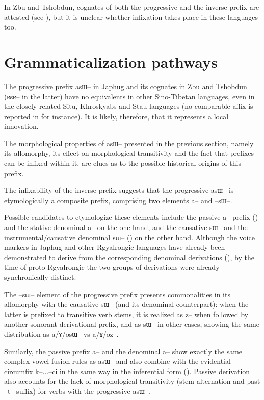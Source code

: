 \documentclass[oldfontcommands,oneside,a4paper,11pt]{article}
\newcommand{\ipa}[1]{{\phon \mbox{#1}}} %
\begin{document}
In Zbu and Tshobdun, cognates of both the progressive and the inverse prefix are attested (see \citealt{jackson02rentongdengdi, gongxun14agreement, gongx18zbu}), but it is unclear whether infixation takes place in these languages too.
 

\section{Grammaticalization pathways}
The progressive prefix \ipa{asɯ--} in Japhug and its cognates in Zbu and Tshobdun (\ipa{ɐsɐ--} in the latter) have no equivalents in other Sino-Tibetan languages, even in the closely related Situ, Khroskyabs and Stau languages (no comparable affix is reported in \citealt{linxr93jiarong, prins16kyomkyo, huangbf07lavrung, lai17khroskyabs, zhang16bragdbar} for instance). It is likely, therefore, that it represents a local innovation.

The morphological properties of \ipa{asɯ--} presented in the previous section, namely its allomorphy, its effect on morphological transitivity and the fact that prefixes can be infixed within it, are clues as to the possible historical origins of this prefix.

The infixability of the inverse prefix suggests that the progressive \ipa{asɯ--} is etymologically a composite prefix, comprising two elements \ipa{a--} and \ipa{--sɯ--}. 

Possible candidates to etymologize these elements include the  passive \ipa{a--} prefix (\citealt{jacques07passif}) and the stative denominal \ipa{a--} on the one hand, and the causative \ipa{sɯ--} and the instrumental/causative denominal \ipa{sɯ--} (\citealt{jacques15causative}) on the other hand. Although the voice markers in Japhug and other Rgyalrongic languages have already been demonstrated to derive from the corresponding denominal derivations (\citealt{jacques14antipassive, jacques15causative, lai16caus}), by the time of proto-Rgyalrongic the two groups of derivations were already synchronically distinct.

The \ipa{--sɯ--} element of the progressive prefix presents commonalities in its allomorphy with the causative \ipa{sɯ--} (and its denominal counterpart): when the latter is prefixed to transitive verb stems, it is realized as \ipa{z--} when followed by another sonorant derivational prefix, and as \ipa{sɯ--} in other cases, showing the same distribution as \ipa{a/ɤ/osɯ--} vs \ipa{a/ɤ/oz--}.

Similarly, the passive prefix \ipa{a--} and the denominal \ipa{a--} show exactly the same complex vowel fusion rules as \ipa{asɯ--} and also combine with the evidential circumfix \ipa{k--...--ci} in the same way in the inferential form (\citealt{jacques07passif}). Passive derivation also accounts for the lack of morphological transitivity (stem alternation and past \ipa{--t--} suffix) for verbs with the progressive \ipa{asɯ--}.
\end{document}
